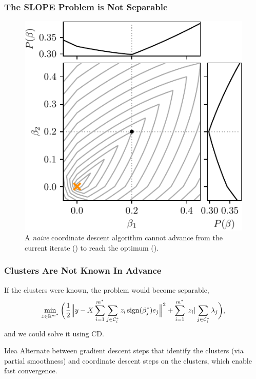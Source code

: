 \begin{frame}
  \frametitle{The SLOPE Problem is Not Separable}

  \begin{figure}[htpb]
    \centering
    \includegraphics[scale=0.8]{figures/naive-cd-stuck.pdf}
    \caption{A \emph{naive} coordinate descent algorithm cannot advance from the
      current iterate () to reach the optimum ({\color{orange}}).}
    \label{fig:naive-cd}
  \end{figure}
\end{frame}

\begin{frame}[c]
  \frametitle{Clusters Are Not Known In Advance}

  If the clusters were known, the problem would become separable,
  \[
    \min_{z \in \mathbb{R}^{m^*}}\bigg(
    \frac{1}{2} \Big\lVert y - X \sum_{i=1}^{m^*} \sum_{j \in \mathcal{C}_i^*} z_i \operatorname{sign}(\beta_j^*) e_j \Big\rVert^2 + \sum_{i=1}^{m^*} | z_i | \sum_{j \in \mathcal{C}_i^*} \lambda_j
    \bigg),
  \]
  and we could solve it using CD.

  \pause

  \begin{block}{Idea}
    Alternate between gradient descent steps that identify the clusters
    (via partial smoothness) and
    coordinate descent steps \alert{on the clusters}, which enable fast convergence.
  \end{block}

\end{frame}

